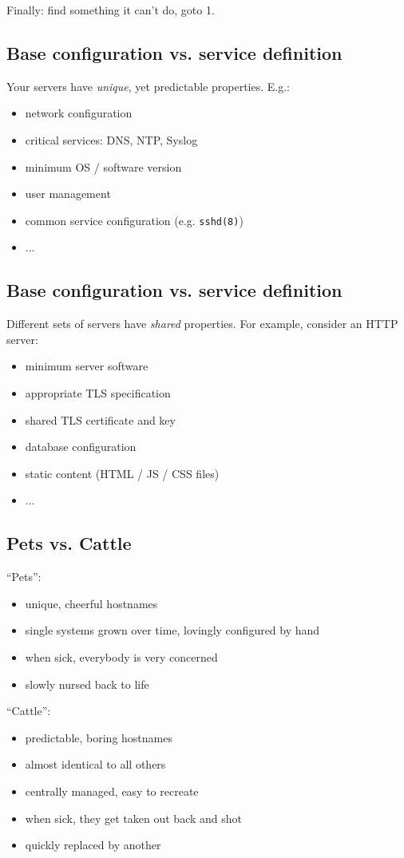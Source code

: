 \documentclass[xga]{xdvislides}
\begin{document}
Finally: find something it can't do, goto 1.

\subsection{Base configuration vs. service definition}
Your servers have {\em unique}, yet predictable
properties.  E.g.:

\begin{itemize}
	\item network configuration
	\item critical services: DNS, NTP, Syslog 
	\item minimum OS / software version
	\item user management
	\item common service configuration (e.g. {\tt sshd(8)})
	\item ...
\end{itemize}

\subsection{Base configuration vs. service definition}
Different sets of servers have {\em shared}
properties.  For example, consider an HTTP server:

\begin{itemize}
	\item minimum server software
	\item appropriate TLS specification
	\item shared TLS certificate and key
	\item database configuration
	\item static content (HTML / JS / CSS files)
	\item ...
\end{itemize}

\subsection{Pets vs. Cattle}
``Pets'':
\begin{itemize}
	\item unique, cheerful hostnames
	\item single systems grown over time, lovingly configured by hand
	\item when sick, everybody is very concerned
	\item slowly nursed back to life
\end{itemize}
\vspace{.25in}
``Cattle'':
\begin{itemize}
	\item predictable, boring hostnames
	\item almost identical to all others
	\item centrally managed, easy to recreate
	\item when sick, they get taken out back and shot
	\item quickly replaced by another
\end{itemize}
\end{document}
